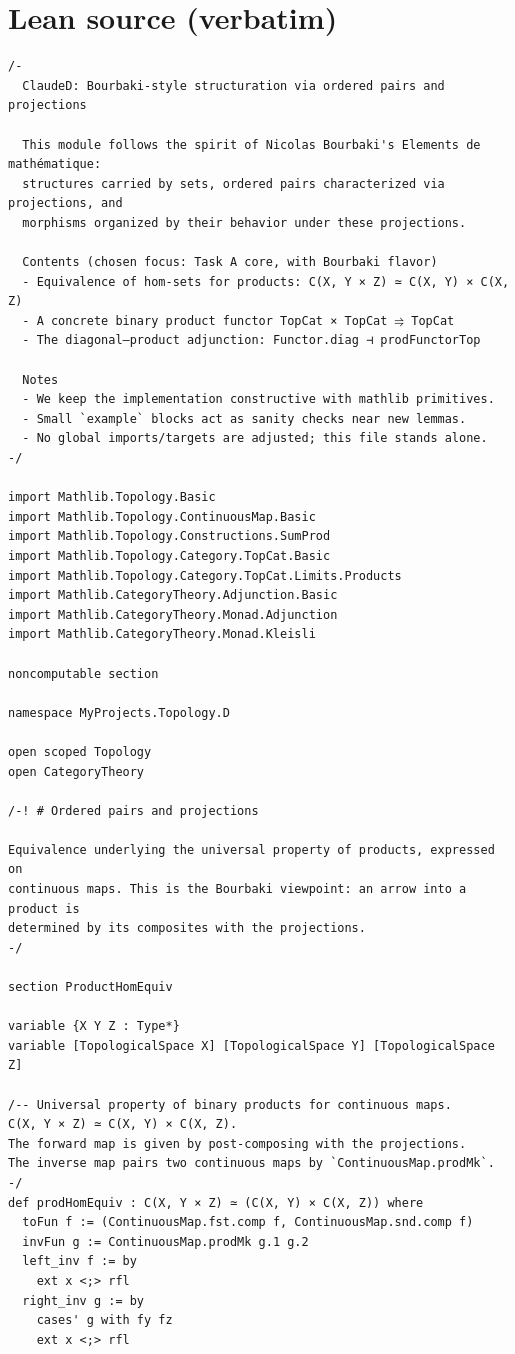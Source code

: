 \documentclass[12pt]{article}
\begin{document}
\section*{Lean source (verbatim)}
\begin{lstlisting}
/-
  ClaudeD: Bourbaki-style structuration via ordered pairs and projections

  This module follows the spirit of Nicolas Bourbaki's Elements de mathématique:
  structures carried by sets, ordered pairs characterized via projections, and
  morphisms organized by their behavior under these projections.

  Contents (chosen focus: Task A core, with Bourbaki flavor)
  - Equivalence of hom-sets for products: C(X, Y × Z) ≃ C(X, Y) × C(X, Z)
  - A concrete binary product functor TopCat × TopCat ⥤ TopCat
  - The diagonal–product adjunction: Functor.diag ⊣ prodFunctorTop

  Notes
  - We keep the implementation constructive with mathlib primitives.
  - Small `example` blocks act as sanity checks near new lemmas.
  - No global imports/targets are adjusted; this file stands alone.
-/

import Mathlib.Topology.Basic
import Mathlib.Topology.ContinuousMap.Basic
import Mathlib.Topology.Constructions.SumProd
import Mathlib.Topology.Category.TopCat.Basic
import Mathlib.Topology.Category.TopCat.Limits.Products
import Mathlib.CategoryTheory.Adjunction.Basic
import Mathlib.CategoryTheory.Monad.Adjunction
import Mathlib.CategoryTheory.Monad.Kleisli

noncomputable section

namespace MyProjects.Topology.D

open scoped Topology
open CategoryTheory

/-! # Ordered pairs and projections

Equivalence underlying the universal property of products, expressed on
continuous maps. This is the Bourbaki viewpoint: an arrow into a product is
determined by its composites with the projections.
-/

section ProductHomEquiv

variable {X Y Z : Type*}
variable [TopologicalSpace X] [TopologicalSpace Y] [TopologicalSpace Z]

/-- Universal property of binary products for continuous maps.
C(X, Y × Z) ≃ C(X, Y) × C(X, Z).
The forward map is given by post-composing with the projections.
The inverse map pairs two continuous maps by `ContinuousMap.prodMk`.
-/
def prodHomEquiv : C(X, Y × Z) ≃ (C(X, Y) × C(X, Z)) where
  toFun f := (ContinuousMap.fst.comp f, ContinuousMap.snd.comp f)
  invFun g := ContinuousMap.prodMk g.1 g.2
  left_inv f := by
    ext x <;> rfl
  right_inv g := by
    cases' g with fy fz
    ext x <;> rfl


\end{lstlisting}
\end{document}
